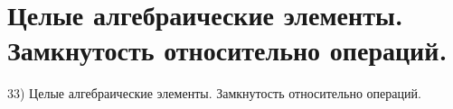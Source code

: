 \section{
 Целые алгебраические элементы. Замкнутость относительно операций.
}

33) Целые алгебраические элементы. Замкнутость относительно операций.
